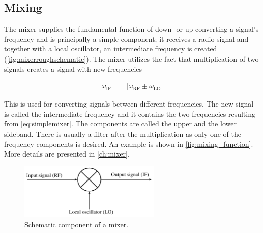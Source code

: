 		\subsection{Mixing}

			The mixer supplies the fundamental function of down- or up-converting a signal's frequency and is principally a simple component; it receives a radio signal and together with a local oscillator, an intermediate frequency is created (\autoref{fig:mixerroughschematic}). The mixer utilizes the fact that multiplication of two signals creates a signal with new frequencies

			\begin{align}\label{eq:simplemixer}
				\omega_\text{IF} &= |\omega_\text{RF}\pm\omega_\text{LO}|
			\end{align}

			This is used for converting signals between different frequencies. The new signal is called the intermediate frequency and it contains the two frequencies resulting from \autoref{eq:simplemixer}. The components are called the upper and the lower sideband. There is usually a filter after the multiplication as only one of the frequency components is desired. An example is shown in \autoref{fig:mixing_function}. More details are presented in \autoref{ch:mixer}.

			\begin{figure}[hbt!]
				\centering
				\includegraphics[width=0.6\textwidth]{fig/mixer/mixer.pdf}
				\caption{Schematic component of a mixer.}\label{fig:mixerroughschematic}
			\end{figure}

